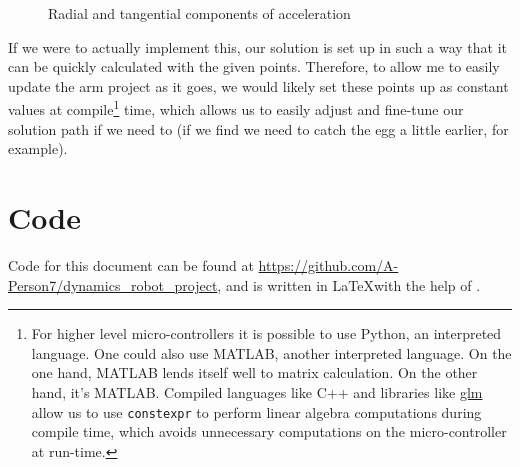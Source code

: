 \documentclass[nofoot,pdf-a,balance,colorlinks,upint,subscriptcorrection,varvw,mathalfa=cal=boondoxo]{asmeconf}
\begin{document}
        \begin{figure}[H]
            \centering

            \caption{Radial and tangential components of acceleration}\label{actuatorAccel2D}
        \end{figure}


        If we were to actually implement this, our solution is set up in such a way that it can be quickly calculated with the given points. Therefore, to allow me to easily update the arm project as it goes, we would likely set these points up as constant values at compile\footnote{For higher level micro-controllers it is possible to use Python, an interpreted language. One could also use MATLAB, another interpreted language. On the one hand, MATLAB lends itself well to matrix calculation. On the other hand, it's MATLAB. Compiled languages like C++ and libraries like \href{https://github.com/g-truc/glm}{glm} allow us to use \texttt{constexpr} to perform linear algebra computations during compile time, which avoids unnecessary computations on the micro-controller at run-time.} time, which allows us to easily adjust and fine-tune our solution path if we need to (if we find we need to catch the egg a little earlier, for example).


    \appendix

    \section{Code}
    Code for this document can be found at \href{https://github.com/A-Person7/dynamics_robot_project}{https://github.com/A-Person7/dynamics_robot_project}, and is written in \LaTeX with the help of .
\end{document}
